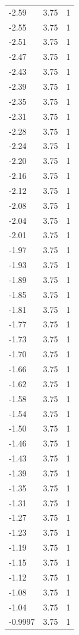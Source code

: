 \begin{longtable}{lrr}
  -2.59 & 3.75 & 1 \\
  -2.55 & 3.75 & 1 \\
  -2.51 & 3.75 & 1 \\
  -2.47 & 3.75 & 1 \\
  -2.43 & 3.75 & 1 \\
  -2.39 & 3.75 & 1 \\
  -2.35 & 3.75 & 1 \\
  -2.31 & 3.75 & 1 \\
  -2.28 & 3.75 & 1 \\
  -2.24 & 3.75 & 1 \\
  -2.20 & 3.75 & 1 \\
  -2.16 & 3.75 & 1 \\
  -2.12 & 3.75 & 1 \\
  -2.08 & 3.75 & 1 \\
  -2.04 & 3.75 & 1 \\
  -2.01 & 3.75 & 1 \\
  -1.97 & 3.75 & 1 \\
  -1.93 & 3.75 & 1 \\
  -1.89 & 3.75 & 1 \\
  -1.85 & 3.75 & 1 \\
  -1.81 & 3.75 & 1 \\
  -1.77 & 3.75 & 1 \\
  -1.73 & 3.75 & 1 \\
  -1.70 & 3.75 & 1 \\
  -1.66 & 3.75 & 1 \\
  -1.62 & 3.75 & 1 \\
  -1.58 & 3.75 & 1 \\
  -1.54 & 3.75 & 1 \\
  -1.50 & 3.75 & 1 \\
  -1.46 & 3.75 & 1 \\
  -1.43 & 3.75 & 1 \\
  -1.39 & 3.75 & 1 \\
  -1.35 & 3.75 & 1 \\
  -1.31 & 3.75 & 1 \\
  -1.27 & 3.75 & 1 \\
  -1.23 & 3.75 & 1 \\
  -1.19 & 3.75 & 1 \\
  -1.15 & 3.75 & 1 \\
  -1.12 & 3.75 & 1 \\
  -1.08 & 3.75 & 1 \\
  -1.04 & 3.75 & 1 \\
  -0.9997 & 3.75 & 1 \\

\end{longtable}

